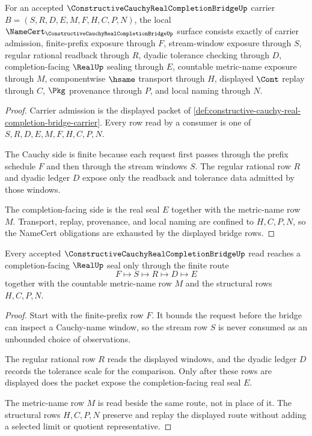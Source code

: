 \begin{theorem}
\label{thm:constructive-cauchy-real-completion-bridge-namecert-obligations}
For an accepted $\ConstructiveCauchyRealCompletionBridgeUp$ carrier $B=(S,R,D,E,M,F,H,C,P,N)$, the local $\NameCert_{\ConstructiveCauchyRealCompletionBridgeUp}$ surface consists exactly of carrier admission, finite-prefix exposure through $F$, stream-window exposure through $S$, regular rational readback through $R$, dyadic tolerance checking through $D$, completion-facing $\RealUp$ sealing through $E$, countable metric-name exposure through $M$, componentwise $\hsame$ transport through $H$, displayed $\Cont$ replay through $C$, $\Pkg$ provenance through $P$, and local naming through $N$.
\end{theorem}
\begin{proof}
Carrier admission is the displayed packet of \autoref{def:constructive-cauchy-real-completion-bridge-carrier}. Every row read by a consumer is one of $S,R,D,E,M,F,H,C,P,N$.

The Cauchy side is finite because each request first passes through the prefix schedule $F$ and then through the stream windows $S$. The regular rational row $R$ and dyadic ledger $D$ expose only the readback and tolerance data admitted by those windows.

The completion-facing side is the real seal $E$ together with the metric-name row $M$. Transport, replay, provenance, and local naming are confined to $H,C,P,N$, so the NameCert obligations are exhausted by the displayed bridge rows.
\end{proof}

\begin{theorem}
\label{thm:constructive-cauchy-real-completion-bridge-cauchy-seal}
Every accepted $\ConstructiveCauchyRealCompletionBridgeUp$ read reaches a completion-facing $\RealUp$ seal only through the finite route
$$
F \longmapsto S \longmapsto R \longmapsto D \longmapsto E
$$
together with the countable metric-name row $M$ and the structural rows $H,C,P,N$.
\end{theorem}
\begin{proof}
Start with the finite-prefix row $F$. It bounds the request before the bridge can inspect a Cauchy-name window, so the stream row $S$ is never consumed as an unbounded choice of observations.

The regular rational row $R$ reads the displayed windows, and the dyadic ledger $D$ records the tolerance scale for the comparison. Only after these rows are displayed does the packet expose the completion-facing real seal $E$.

The metric-name row $M$ is read beside the same route, not in place of it. The structural rows $H,C,P,N$ preserve and replay the displayed route without adding a selected limit or quotient representative.
\end{proof}

